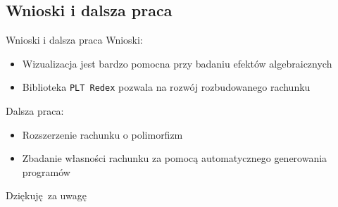 \documentclass{beamer}
\newcommand{\Redex}{\texttt{PLT Redex}}
\begin{document}
\subsection{Wnioski i dalsza praca}
\begin{frame}{Wnioski i dalsza praca}
  Wnioski:
  \begin{itemize}
    \item Wizualizacja jest bardzo pomocna przy badaniu efektów algebraicznych
    \pause
    \item Biblioteka \Redex{} pozwala na rozwój rozbudowanego rachunku
  \end{itemize}
  \pause
  Dalsza praca:
  \begin{itemize}
    \pause
    \item Rozszerzenie rachunku o polimorfizm
    \pause
    \item Zbadanie własności rachunku za pomocą automatycznego generowania programów
  \end{itemize}
\end{frame}

\begin{frame}
  \centering
  Dziękuję za uwagę
\end{frame}

\begin{frame}
  \titlepage
\end{frame}
\end{document}
